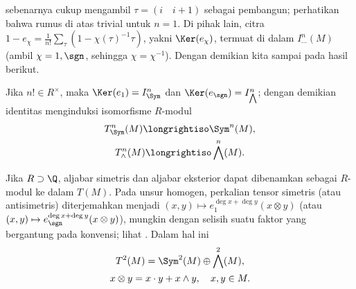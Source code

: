 sebenarnya cukup mengambil $\tau= (i \quad i+1)$ sebagai pembangun; perhatikan bahwa rumus di atas trivial untuk $n=1$. Di pihak lain, citra $1 - e_\chi = \frac{1}{n!} \sum_\tau (1 - \chi(\tau)^{-1} \tau)$, yakni $\Ker(e_\chi)$, termuat di dalam $I^n_{\cdots}(M)$ (ambil $\chi = 1, \sgn$, sehingga $\chi=\chi^{-1}$). Dengan demikian kita sampai pada hasil berikut.
\begin{theorem}
	Jika $n! \in R^\times$, maka $\Ker(e_1) = I^n_{\Sym}$ dan $\Ker(e_{\sgn}) = I^n_{\bigwedge}$; dengan demikian identitas menginduksi isomorfisme $R$-modul
	\begin{gather*}
		T^n_{\Sym}(M) \longrightiso \Sym^n(M), \\
		T^n_\wedge(M) \longrightiso \bigwedge^n(M).
	\end{gather*}
\end{theorem}

Jika $R \supset \Q$, aljabar simetris dan aljabar eksterior dapat dibenamkan sebagai $R$-modul ke dalam $T(M)$. Pada unsur homogen, perkalian tensor simetris (atau antisimetris) diterjemahkan menjadi $(x,y) \mapsto e^{\deg x + \deg y}_1(x \otimes y)$ (atau $(x, y) \mapsto e^{\deg x + \deg y}_{\sgn}(x \otimes y)$), mungkin dengan selisih suatu faktor yang bergantung pada konvensi; lihat \cite[\S 2 (3.1)]{ChCh}. Dalam hal ini
\begin{gather*}
	T^2(M) = \Sym^2(M) \oplus \bigwedge^2(M), \\
	x \otimes y = x \cdot y + x \wedge y, \quad x,y \in M.
\end{gather*}

